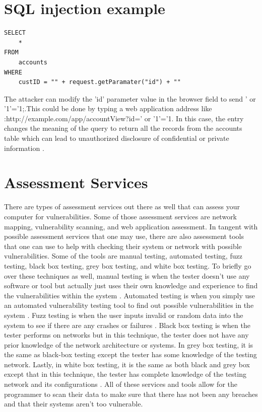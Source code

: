 \section{SQL injection example}
\label{sec:sql injection example}


\bigskip
\bigskip
\begin{lstlisting}
SELECT
    *
FROM
    accounts
WHERE
    custID = "" + request.getParamater("id") + ""
\end{lstlisting}
\bigskip
\bigskip
\begin{sloppypar}
The attacker can modify the 'id' parameter value in 
the browser field to send ' or '1'='1;.This could be done by typing a web application address like :http://example.com/app/accountView?id=' or '1'='1. 
In this case, the entry changes the meaning of the query 
to return all the records from the accounts table 
which can lead to unauthorized disclosure of confidential 
or private information \cite{horner2017sql}.
\end{sloppypar}
\section{Assessment Services}
\label{sec: assessment services}


There are types of assessment services out there as well that can assess your computer for vulnerabilities. Some of those assessment services are network mapping, vulnerability scanning, and web application assessment. In tangent with possible assessment services that one may use, there are also assessment tools that one can use to help with checking their system or network with possible vulnerabilities. Some of the tools are manual testing, automated testing, fuzz testing, black box testing, grey box testing, and white box testing. To briefly go over these techniques as well, manual testing is when the tester doesn't use any software or tool but actually just uses their own knowledge and experience to find the vulnerabilities within the system \cite{SoftwareT}.
Automated testing is when you simply use an automated vulnerability testing tool to find out possible vulnerabilities in the system \cite{automate2006}.
Fuzz testing is when the user inputs invalid or random data into the system to see if there are any crashes or failures \cite{fuzzmisc}.
Black box testing is when the tester performs on networks but in this technique, the tester does not have any prior knowledge of the network architecture or systems.
In grey box testing, it is the same as black-box testing except the tester has some knowledge of the testing network.
Lastly, in white box testing, it is the same as both black and grey box except that in this technique, the tester has complete knowledge of the testing network and its configurations \cite{goel2015vulnerability}.
All of these services and tools allow for the programmer to scan their data to make sure that there has not been any breaches and that their systems aren't too vulnerable.

